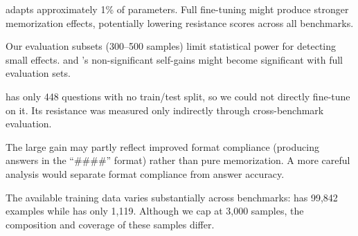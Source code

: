  \lora adapts approximately 1\% of parameters. Full fine-tuning might produce stronger memorization effects, potentially lowering resistance scores across all benchmarks.

 Our evaluation subsets (300--500 samples) limit statistical power for detecting small effects. \mmlu and \arc's non-significant self-gains might become significant with full evaluation sets.

 \gpqa has only 448 questions with no train/test split, so we could not directly fine-tune on it. Its resistance was measured only indirectly through cross-benchmark evaluation.

 The large \gsmk gain may partly reflect improved format compliance (producing answers in the ``\#\#\#\#'' format) rather than pure memorization. A more careful analysis would separate format compliance from answer accuracy.

 The available training data varies substantially across benchmarks: \mmlu has 99{,}842 examples while \arc has only 1{,}119. Although we cap at 3{,}000 samples, the composition and coverage of these samples differ.
